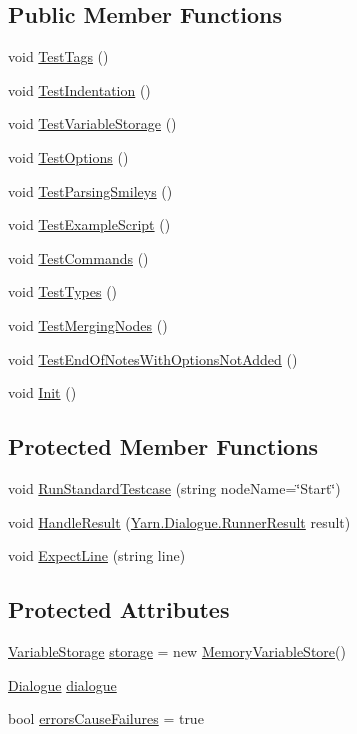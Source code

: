 \subsection*{Public Member Functions}
\begin{DoxyCompactItemize}
\item 
void \hyperlink{a00098_a08ea3ce23a86ac148b79ccafda629a26}{Test\-Tags} ()
\item 
void \hyperlink{a00098_a362c5ebd264980ebc9ba4df36b97c885}{Test\-Indentation} ()
\item 
void \hyperlink{a00098_aba85969007707d78dd3da94cdcabaa83}{Test\-Variable\-Storage} ()
\item 
void \hyperlink{a00098_ad81b7da69ab4b662eba838860402bb8d}{Test\-Options} ()
\item 
void \hyperlink{a00098_a0036732bb105c0776e8061a9f9ec58f6}{Test\-Parsing\-Smileys} ()
\item 
void \hyperlink{a00098_a1d044fd44e610a35ef09d486eb06ee37}{Test\-Example\-Script} ()
\item 
void \hyperlink{a00098_a444de0b9a3cad905065960001a5e19df}{Test\-Commands} ()
\item 
void \hyperlink{a00098_a6bf682420e6a34aa739a2442bb8896b2}{Test\-Types} ()
\item 
void \hyperlink{a00098_a4da987e2dbc65b35cc6bd07392f71453}{Test\-Merging\-Nodes} ()
\item 
void \hyperlink{a00098_a6cc57344745b5fb315abdeacdd23b659}{Test\-End\-Of\-Notes\-With\-Options\-Not\-Added} ()
\item 
void \hyperlink{a00144_a357a0dab579f9e45666c10779683dc27}{Init} ()
\end{DoxyCompactItemize}
\subsection*{Protected Member Functions}
\begin{DoxyCompactItemize}
\item 
void \hyperlink{a00144_abffa134d40d72b21e6b35c3bf05fc53f}{Run\-Standard\-Testcase} (string node\-Name=\char`\"{}Start\char`\"{})
\item 
void \hyperlink{a00144_a7b525f85a26d7c942e1cbfa5d6453893}{Handle\-Result} (\hyperlink{a00130}{Yarn.\-Dialogue.\-Runner\-Result} result)
\item 
void \hyperlink{a00144_ac21a5082ddac1da9db17ae54038df44e}{Expect\-Line} (string line)
\end{DoxyCompactItemize}
\subsection*{Protected Attributes}
\begin{DoxyCompactItemize}
\item 
\hyperlink{a00164}{Variable\-Storage} \hyperlink{a00144_a23d59ace1516ca72924c6fe3feafd3f7}{storage} = new \hyperlink{a00108}{Memory\-Variable\-Store}()
\item 
\hyperlink{a00070}{Dialogue} \hyperlink{a00144_a4cff5de56c4b8a91c76b6eb2d622a795}{dialogue}
\item 
bool \hyperlink{a00144_ac978fe85db843c51411f5517bdbe0eb8}{errors\-Cause\-Failures} = true
\end{DoxyCompactItemize}
